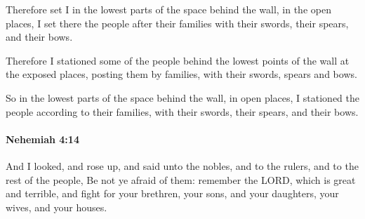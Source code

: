 			\begin{versebox}
					\item[BHS] 
					\item[LXX] 
					\item[ASV] Therefore set I in the lowest parts of the space behind the wall, in the open places, I set there the people after their families with their swords, their spears, and their bows.
					\item[NIV] Therefore I stationed some of the people behind the lowest points of the wall at the exposed places, posting them by families, with their swords, spears and bows.
					\item[NRSV] So in the lowest parts of the space behind the wall, in open places, I stationed the people according to their families, with their swords, their spears, and their bows.
			\end{versebox}

		\paragraph{Nehemiah 4:14} %
			\label{NEHEMIAH-4-14}

			And I looked, and rose up, and said unto the nobles, and to the rulers, and to the rest of the people, Be not ye afraid of them: remember the LORD, which is great and terrible, and fight for your brethren, your sons, and your daughters, your wives, and your houses.

